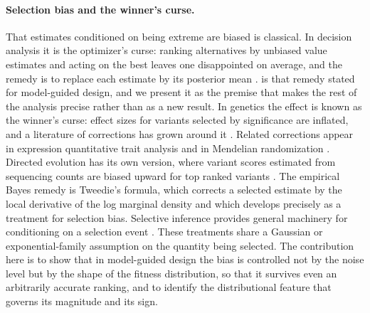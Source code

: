 \documentclass{article}
\theoremstyle{plain}
\theoremstyle{definition}
\begin{document}
\paragraph{Selection bias and the winner's curse.}
That estimates conditioned on being extreme are biased is classical. In decision
analysis it is the optimizer's curse: ranking alternatives by unbiased value estimates
and acting on the best leaves one disappointed on average, and the remedy is to replace
each estimate by its posterior mean \citep{smith2006optimizer}.  is
that remedy stated for model-guided design, and we present it as the premise that makes
the rest of the analysis precise rather than as a new result.
In genetics the effect is known as the winner's curse: effect sizes for variants
selected by significance are inflated, and a literature of corrections has grown around
it \citep{goring2001large, zollner2007overcoming, zhong2008bias, palmer2017statistical,
forde2023review}. Related corrections appear in expression quantitative trait analysis
\citep{huang2018bootstrapqtl} and in Mendelian randomization
\citep{sadreev2021empirical}. Directed evolution has its own version, where variant
scores estimated from sequencing counts are biased upward for top ranked variants
\citep{nemoto2023acides}. The empirical Bayes remedy is Tweedie's formula, which
corrects a selected estimate by the local derivative of the log marginal density and
which \citet{efron2011tweedie} develops precisely as a treatment for selection bias.
Selective inference provides general machinery for
conditioning on a selection event \citep{benjamini2005false, taylor2015statistical,
tibshirani2016exact, fithian2014optimal}. These treatments share a Gaussian or
exponential-family assumption on the quantity being selected. The contribution here is
to show that in model-guided design the bias is controlled not by the noise level but by
the shape of the fitness distribution, so that it survives even an arbitrarily accurate
ranking, and to identify the distributional feature that governs its magnitude and its
sign.
\end{document}
